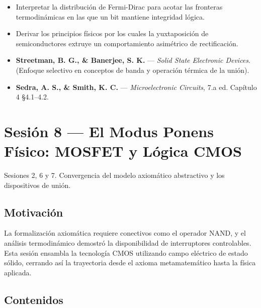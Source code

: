 \documentclass[11pt, letterpaper]{article}
\begin{document}
\begin{objetivos}
\begin{itemize}
  \item Interpretar la distribuci\'on de Fermi-Dirac para acotar las fronteras termodin\'amicas en las que un bit mantiene integridad l\'ogica.
  \item Derivar los principios f\'isicos por los cuales la yuxtaposici\'on de semiconductores extruye un comportamiento asim\'etrico de rectificaci\'on.
\end{itemize}
\end{objetivos}

\begin{lecturas}
\begin{itemize}
  \item[$(\star)$] \textbf{Streetman, B. G., \& Banerjee, S. K.} --- \emph{Solid State Electronic Devices}. (Enfoque selectivo en conceptos de banda y operaci\'on t\'ermica de la uni\'on).
  \item \textbf{Sedra, A. S., \& Smith, K. C.} --- \emph{Microelectronic Circuits}, 7.a ed. Cap\'itulo 4 \S4.1--4.2.
\end{itemize}
\end{lecturas}

\newpage

\section{Sesi\'on 8 --- El Modus Ponens F\'isico: MOSFET y L\'ogica CMOS}

\begin{prereqs}
Sesiones 2, 6 y 7. Convergencia del modelo axiom\'atico abstractivo y los dispositivos de uni\'on.
\end{prereqs}

\subsection*{Motivaci\'on}
La formalizaci\'on axiom\'atica requiere conectivos como el operador NAND, y el an\'alisis termodin\'amico demostr\'o la disponibilidad de interruptores controlables. Esta sesi\'on ensambla la tecnolog\'ia CMOS utilizando campo el\'ectrico de estado s\'olido, cerrando as\'i la trayectoria desde el axioma metamatem\'atico hasta la f\'isica aplicada.

\subsection{Contenidos}
\end{document}
